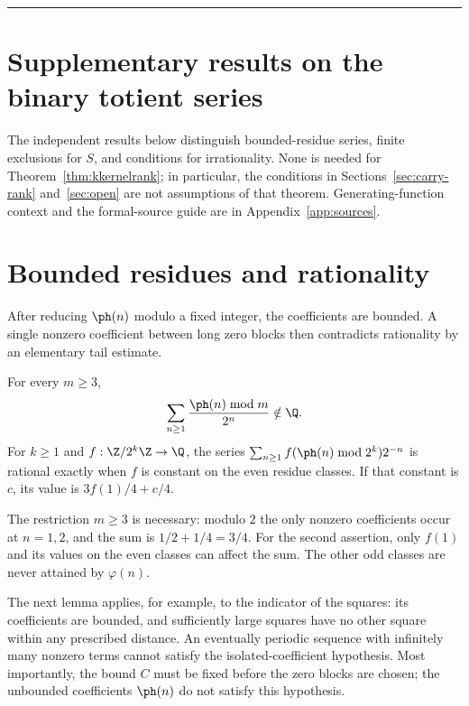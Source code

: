 \documentclass[11pt]{article}
\begin{document}
\bigskip\hrule\medskip
\section*{Supplementary results on the binary totient series}
The independent results below distinguish bounded-residue series,
finite exclusions for $S$, and conditions for irrationality. None is
needed for Theorem~\ref{thm:kkernelrank}; in particular, the conditions
in Sections~\ref{sec:carry-rank} and~\ref{sec:open} are not assumptions
of that theorem. Generating-function context and the formal-source guide
are in Appendix~\ref{app:sources}.

\section{Bounded residues and rationality}\label{sec:family}
After reducing $\ph(n)$ modulo a fixed integer, the coefficients are
bounded. A single nonzero coefficient between long zero blocks then
contradicts rationality by an elementary tail estimate.

\begin{theorem}\label{res:residueseries}
For every $m\ge3$,
\[
 \sum_{n\ge1}\frac{\ph(n)\bmod m}{2^n}\notin\Q.
\]
For $k\ge1$ and $f:\Z/2^k\Z\to\Q$, the series
$\sum_{n\ge1}f(\ph(n)\bmod2^k)2^{-n}$ is rational exactly when $f$ is
constant on the even residue classes. If that constant is $c$, its value is
$3f(1)/4+c/4$.
\end{theorem}

The restriction $m\ge3$ is necessary: modulo $2$ the only nonzero
coefficients occur at $n=1,2$, and the sum is $1/2+1/4=3/4$.
For the second assertion, only $f(1)$ and its values on the even classes
can affect the sum. The other odd classes are never attained by
$\varphi(n)$.

The next lemma applies, for example, to the indicator of the squares:
its coefficients are bounded, and sufficiently large squares have no other
square within any prescribed distance. An eventually periodic sequence
with infinitely many nonzero terms cannot satisfy the isolated-coefficient
hypothesis. Most importantly,
the bound $C$ must be fixed before the zero blocks are chosen; the
unbounded coefficients $\ph(n)$ do not satisfy this hypothesis.
\end{document}
